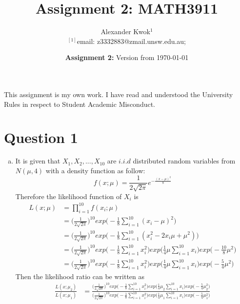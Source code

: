 \documentclass[a4paper,11pt]{article}
\begin{document}
\title{Assignment 2: MATH3911}
\author{Alexander Kwok$^{1}$  
\\$^{[1]}${\small email:
z3332883@zmail.unsw.edu.au; } 
}

\date{\textbf{Assignment 2:} Version from \today }

\maketitle
This assignment is my own work. I have read and understood the University Rules in respect to Student Academic Misconduct.
\section*{Question 1}
\begin{enumerate}[(a)]
	\item
		It is given that $X_1,X_2, ...,X_{10}$ are $i.i.d$ distributed random variables from $N(\mu,4)$ with a density function as follow:\\
		\[
		f(x;\mu) = \frac{1}{2\sqrt{2\pi}}e^{-\frac{(x-\mu)^2}{8}}
		\]
		Therefore the likelihood function of $X_i$ is
		\begin{align*}
		L(x;\mu)&=\prod^{10}_{i=1} f(x_i;\mu)\\
		&= \bigg( \frac{1}{2\sqrt{2\pi}}  \bigg)^{10} exp\bigg(-\frac{1}{8}\sum^{10}_{i=1}(x_i-\mu)^2   \bigg)\\
		&= \bigg( \frac{1}{2\sqrt{2\pi}}  \bigg)^{10} exp\bigg(-\frac{1}{8}\sum^{10}_{i=1}(x_i^2-2x_i\mu+\mu^2)   \bigg)\\
		&= \bigg( \frac{1}{2\sqrt{2\pi}}  \bigg)^{10} exp\bigg(-\frac{1}{8}\sum^{10}_{i=1}x_i^2 \bigg)exp\bigg(\frac{1}{4}\mu\sum^{10}_{i=1}x_i   \bigg)exp\bigg(-\frac{10}{8}\mu^2   \bigg)\\
		&= \bigg( \frac{1}{2\sqrt{2\pi}}  \bigg)^{10} exp\bigg(-\frac{1}{8}\sum^{10}_{i=1}x_i^2 \bigg)exp\bigg(\frac{1}{4}\mu\sum^{10}_{i=1}x_i   \bigg)exp\bigg(-\frac{5}{4}\mu^2   \bigg)
		\end{align*}
		Then the likelihood ratio can be written as
		\begin{align*}
		\frac{L(x;\mu_2)}{L(x;\mu_1)}&=\frac{\bigg( \frac{1}{2\sqrt{2\pi}} \bigg)^{10}exp\bigg(-\frac{1}{8}\sum^{10}_{i=1}x_i^2 \bigg)exp\bigg(\frac{1}{4}\mu_2\sum^{10}_{i=1}x_i   \bigg)exp\bigg(-\frac{5}{4}\mu_2^2   \bigg)
}{\bigg(\frac{1}{2\sqrt{2\pi}}  \bigg)^{10}exp\bigg(-\frac{1}{8}\sum^{10}_{i=1}x_i^2 \bigg)exp\bigg(\frac{1}{4}\mu_1\sum^{10}_{i=1}x_i   \bigg)exp\bigg(-\frac{5}{4}\mu_1^2   \bigg)
}\\

\end{align*}
\end{enumerate}
\end{document}
